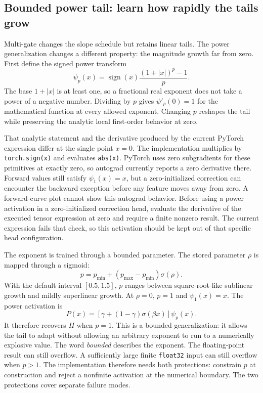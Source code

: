 \documentclass[10pt,aps,prd,twocolumn,nofootinbib]{revtex4-2}
\newcommand{\code}[1]{\texttt{#1}}
\begin{document}
\subsection{Bounded power tail: learn how rapidly the tails grow}

Multi-gate changes the slope schedule but retains linear tails.  The power
generalization changes a different property: the magnitude growth far from
zero.  First define the signed power transform
\begin{equation}
 \psi_p(x)=\operatorname{sign}(x)
 \frac{(1+|x|)^p-1}{p}.
 \label{eq:psi}
\end{equation}
The base \(1+|x|\) is at least one, so a fractional real exponent does not
take a power of a negative number.  Dividing by $p$ gives
$\psi'_p(0)=1$ for the mathematical function at every allowed exponent.
Changing $p$ reshapes the tail while preserving the analytic
local first-order behavior at zero.

That analytic statement and the derivative produced by the current PyTorch
expression differ at the single point $x=0$.  The implementation
multiplies by \code{torch.sign(x)} and evaluates \code{abs(x)}.  PyTorch uses
zero subgradients for these primitives at exactly zero, so autograd currently
reports a zero derivative there.  Forward values still satisfy
$\psi_1(x)=x$, but a zero-initialized correction can encounter the backward
exception before any feature moves away from zero.  A forward-curve plot cannot
show this autograd behavior.  Before using a power activation in a
zero-initialized correction head, evaluate the derivative of the executed
tensor expression at zero and require a finite nonzero result.  The current
expression fails that check, so this activation should be kept out of that
specific head configuration.

The exponent is trained through a bounded parameter.  The stored
parameter \(\rho\) is mapped through a sigmoid:
\begin{equation}
 p=p_{\min}+(p_{\max}-p_{\min})\sigma(\rho).
 \label{eq:pbox}
\end{equation}
With the default interval \([0.5,1.5]\), \(p\) ranges between
square-root-like sublinear growth and mildly superlinear growth.  At
\(\rho=0\), \(p=1\) and \(\psi_1(x)=x\).  The power activation is
\begin{equation}
 P(x)=\left[\gamma+(1-\gamma)\sigma(\beta x)\right]\psi_p(x).
 \label{eq:poweractivation}
\end{equation}
It therefore recovers \(H\) when \(p=1\).  This is a bounded generalization:
it allows the tail to adapt without allowing an arbitrary exponent to run to
a numerically explosive value.  The word \emph{bounded} describes the
exponent.  The floating-point result can still overflow.  A sufficiently large finite
\code{float32} input can still overflow when \(p>1\).  The implementation
therefore needs both protections: constrain \(p\) at construction and reject
a nonfinite activation at the numerical boundary.  The two protections cover
separate failure modes.
\end{document}

